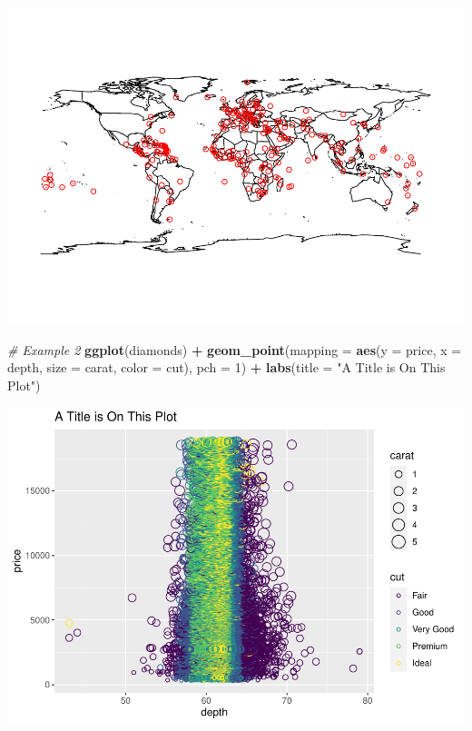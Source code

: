\documentclass[
]{book}
\newenvironment{Shaded}{\begin{snugshade}}{\end{snugshade}}
\newcommand{\CommentTok}[1]{\textcolor[rgb]{0.56,0.35,0.01}{\textit{#1}}}
\newcommand{\DataTypeTok}[1]{\textcolor[rgb]{0.13,0.29,0.53}{#1}}
\newcommand{\DecValTok}[1]{\textcolor[rgb]{0.00,0.00,0.81}{#1}}
\newcommand{\KeywordTok}[1]{\textcolor[rgb]{0.13,0.29,0.53}{\textbf{#1}}}
\newcommand{\NormalTok}[1]{#1}
\newcommand{\OperatorTok}[1]{\textcolor[rgb]{0.81,0.36,0.00}{\textbf{#1}}}
\newcommand{\StringTok}[1]{\textcolor[rgb]{0.31,0.60,0.02}{#1}}
\begin{document}
\includegraphics{_main_files/figure-latex/unnamed-chunk-258-1.pdf}

\begin{Shaded}
\begin{Highlighting}[]
\CommentTok{# Example 2}
\KeywordTok{ggplot}\NormalTok{(diamonds) }\OperatorTok{+}\StringTok{ }\KeywordTok{geom_point}\NormalTok{(}\DataTypeTok{mapping =} \KeywordTok{aes}\NormalTok{(}\DataTypeTok{y =}\NormalTok{ price, }\DataTypeTok{x =}\NormalTok{ depth,}
    \DataTypeTok{size =}\NormalTok{ carat, }\DataTypeTok{color =}\NormalTok{ cut), }\DataTypeTok{pch =} \DecValTok{1}\NormalTok{) }\OperatorTok{+}\StringTok{ }\KeywordTok{labs}\NormalTok{(}\DataTypeTok{title =} \StringTok{"A Title is On This Plot"}\NormalTok{)}
\end{Highlighting}
\end{Shaded}

\includegraphics{_main_files/figure-latex/unnamed-chunk-258-2.pdf}
\end{document}
